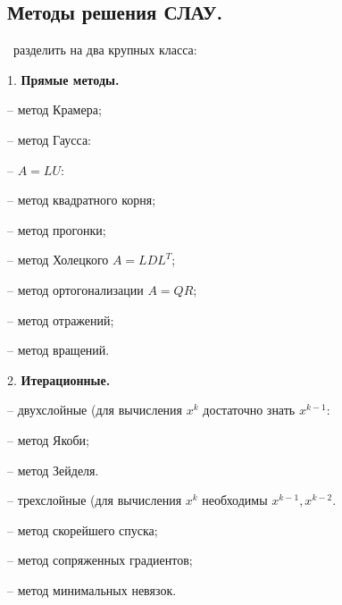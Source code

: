 \documentclass[9pt]{article}
\begin{document}
\subsection{Методы решения СЛАУ.}

\ 
 разделить на два крупных класса:
\par1. \textbf{Прямые методы.}
\par-- метод Крамера;
\par-- метод Гаусса:
\par\quad-- \(A=LU\):
\par\quad\quad-- метод квадратного корня;
\par\quad-- метод прогонки;
\par-- метод Холецкого \(A=LDL^T\);
\par-- метод ортогонализации \(A=QR\);
\par-- метод отражений;
\par-- метод вращений.
\par2. \textbf{Итерационные.}
\par-- двухслойные (для вычисления \(x^k\) достаточно знать \(x^{k-1}\):
\par\quad-- метод Якоби;
\par\quad-- метод Зейделя.
\par-- трехслойные (для вычисления \(x^k\) необходимы \(x^{k-1},x^{k-2}\).
\par-- метод скорейшего спуска;
\par-- метод сопряженных градиентов;
\par-- метод минимальных невязок.
\end{document}
